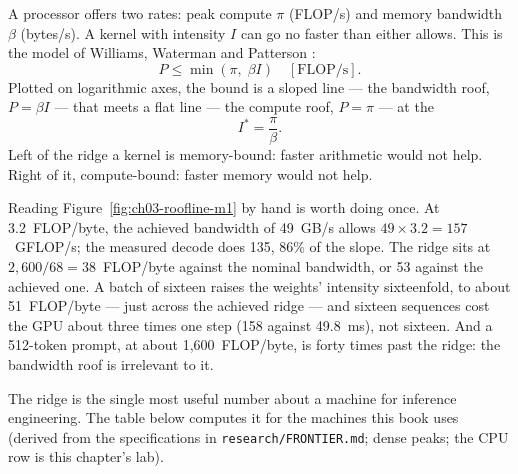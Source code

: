 A processor offers two rates: peak compute $\pi$ (FLOP/s) and memory bandwidth
$\beta$ (bytes/s). A kernel with intensity $I$ can go no faster than either
allows. This is the  model of Williams, Waterman and Patterson
\cite{williams2009roofline}:
\begin{equation}
P \le \min\left(\pi,\; \beta I\right)\quad[\text{FLOP/s}].
\label{eq:roofline}
\end{equation}
Plotted on logarithmic axes, the bound is a sloped line --- the bandwidth roof,
$P=\beta I$ --- that meets a flat line --- the compute roof, $P=\pi$ --- at the
\begin{equation}
I^{*} = \frac{\pi}{\beta}.
\label{eq:ridge}
\end{equation}
Left of the ridge a kernel is memory-bound: faster arithmetic would not help.
Right of it, compute-bound: faster memory would not help.


Reading Figure~\ref{fig:ch03-roofline-m1} by hand is worth doing once. At
3.2~FLOP/byte, the achieved bandwidth of 49~GB/s allows
$49 \times 3.2 = 157$~GFLOP/s; the measured decode does 135, 86\% of the
slope. The ridge sits at $2{,}600/68 = 38$~FLOP/byte against the nominal
bandwidth, or 53 against the achieved one. A batch of sixteen raises the
weights' intensity sixteenfold, to about 51~FLOP/byte --- just across the
achieved ridge --- and sixteen sequences cost the GPU about three times one
step (158 against 49.8~ms), not sixteen. And a
512-token prompt, at about 1,600~FLOP/byte, is forty times past the ridge: the
bandwidth roof is irrelevant to it.

The ridge is the single most useful number about a machine for inference
engineering. The table below computes it for the machines this book uses
(derived from the specifications in \texttt{research/FRONTIER.md}; dense
peaks; the CPU row is this chapter's lab).

